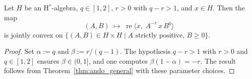 \begin{theorem}
  \label{thm:ando}
  \leanok
  Let $H$ be an H$^*$-algebra, $q \in [1,2]$, $r > 0$ with $q - r > 1$,
  and $x \in H$.
  Then the map
  \[
    (A, B) \;\longmapsto\; \operatorname{re}\bigl\langle x,\;
      A^{-r}\, x\, B^{q} \bigr\rangle
  \]
  is jointly convex on
  $\{(A, B) \in H \times H \mid A \text{ strictly positive},\, B \geq 0\}$.
  \begin{proof}
    \leanok
    Set $\alpha := q$ and $\beta := r / (q - 1)$.
    The hypothesis $q - r > 1$ with $r > 0$ and $q \in [1,2]$ ensures
    $\beta \in (0,1]$, and one computes $\beta(1-\alpha) = -r$.
    The result follows from Theorem~\ref{thm:ando_general} with these
    parameter choices.
  \end{proof}
\end{theorem}
